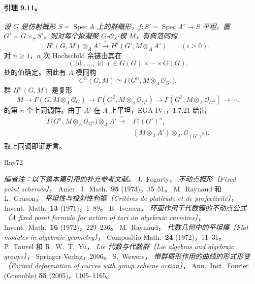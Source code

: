 \paragraph{\textbf{引理 9.11。}}
\emph{设 \(G\) 是仿射概形 \(S=\operatorname{Spec}A\) 上的群概形，\(f:S'=\operatorname{Spec}A'\to S\) 平坦。置 \(G'=G\times_S S'\)。则对每个拟凝聚 \(G\)-\(\mathcal O_S\)-模 \(M\)，有典范同构}
\[
  H^i(G,M)\otimes_A A'
  \xrightarrow{\ \sim\ }
  H^i(G',M\otimes_A A')
  \qquad(i\geq 0).
\]
对 \(n\geq1\)，\(n\) 次 Hochschild 余链由其在
\[
  (\operatorname{id},\ldots,\operatorname{id})
  \in G(G)\times\cdots\times G(G).
\]
处的值确定。因此有 \(A\)-模同构
\[
  C^n(G,M)
  \simeq
  \Gamma\bigl(G^n,M\otimes_A\mathcal O_{G^n}\bigr).
\]
群 \(H^n(G,M)\) 是复形
\[
  M\longrightarrow
  \Gamma(G,M\otimes_A\mathcal O_G)\longrightarrow
  \Gamma(G^2,M\otimes_A\mathcal O_{G^2})\longrightarrow
  \Gamma(G^3,M\otimes_A\mathcal O_{G^3})\longrightarrow\cdots.
\]
的第 \(n\) 个上同调群。由于 \(A'\) 在 \(A\) 上平坦，EGA IV\(_1\)，1.7.21 给出
\[
\begin{split}
  \Gamma\bigl(G^n,M\otimes_A\mathcal O_{G^n}\bigr)\otimes_A A'
  \xrightarrow{\ \sim\ }{}&
  \Gamma\bigl((G')^n,\\
  &(M\otimes_A A')\otimes_{A'}
  \mathcal O_{(G')^n}\bigr).
\end{split}
\]
取上同调即证断言。
\begin{thebibliography}{Ray72}
\item[]\emph{编者注：以下是本篇引用的补充参考文献。}
J.\ Fogarty，
\emph{不动点概形〔Fixed point schemes〕}，
Amer.\ J.\ Math.\ \textbf{95} (1973)，35--51。
M.\ Raynaud 和 L.\ Gruson，
\emph{平坦性与投射性判据〔Critères de platitude et de projectivité〕}，
Invent.\ Math.\ \textbf{13} (1971)，1--89。
B.\ Iversen，
\emph{环面作用于代数簇的不动点公式〔A fixed point formula for action of tori on algebraic varieties〕}，
Invent.\ Math.\ \textbf{16} (1972)，229--236。
M.\ Raynaud，
\emph{代数几何中的平坦模〔Flat modules in algebraic geometry〕}，
Compositio Math.\ \textbf{24} (1972)，11--31。
P.\ Tauvel 和 R.\ W.\ T.\ Yu，
\emph{Lie 代数与代数群〔Lie algebras and algebraic groups〕}，
Springer-Verlag，2006。
S.\ Wewers，
\emph{带群概形作用的曲线的形式形变〔Formal deformation of curves with group scheme action〕}，
Ann.\ Inst.\ Fourier (Grenoble) \textbf{55} (2005)，1105--1165。
\end{thebibliography}
